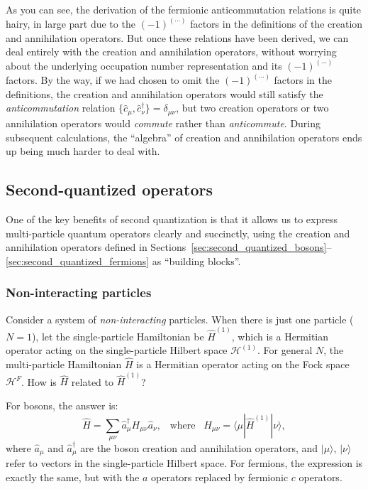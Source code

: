 \documentclass[pra,12pt]{revtex4}
\begin{document}
As you can see, the derivation of the fermionic anticommutation
relations is quite hairy, in large part due to the $(-1)^{(\cdots)}$
factors in the definitions of the creation and annihilation operators.
But once these relations have been derived, we can deal entirely with
the creation and annihilation operators, without worrying about the
underlying occupation number representation and its $(-1)^{(\cdots)}$
factors.  By the way, if we had chosen to omit the $(-1)^{(\cdots)}$
factors in the definitions, the creation and annihilation operators
would still satisfy the \textit{anticommutation} relation
$\{\hat{c}_\mu,\hat{c}_\nu^\dagger\}=\delta_{\mu\nu}$, but two
creation operators or two annihilation operators would
\textit{commute} rather than \textit{anticommute}.  During subsequent
calculations, the ``algebra'' of creation and annihilation operators
ends up being much harder to deal with.

\subsection{Second-quantized operators}
\label{sec:second_quant_op}

One of the key benefits of second quantization is that it allows us to
express multi-particle quantum operators clearly and succinctly, using
the creation and annihilation operators defined in
Sections~\ref{sec:second_quantized_bosons}--\ref{sec:second_quantized_fermions}
as ``building blocks''.

\subsubsection{Non-interacting particles}

Consider a system of \textit{non-interacting} particles.  When there
is just one particle ($N=1$), let the single-particle Hamiltonian be
$\hat{H}^{(1)}$, which is a Hermitian operator acting on the
single-particle Hilbert space $\mathscr{H}^{(1)}$.  For general $N$,
the multi-particle Hamiltonian $\hat{H}$ is a Hermitian operator
acting on the Fock space $\mathscr{H}^F$.  How is $\hat{H}$ related to
$\hat{H}^{(1)}$?

For bosons, the answer is:
\begin{equation}
  \hat{H} = \sum_{\mu\nu} \hat{a}^\dagger_\mu H_{\mu\nu} \hat{a}_\nu,
  \;\;\; \mathrm{where}\;\;\;
  H_{\mu\nu} = \langle\mu|\hat{H}^{(1)}|\nu\rangle,
  \label{twobosonH}
\end{equation}
where $\hat{a}_\mu$ and $\hat{a}_\mu^\dagger$ are the boson creation
and annihilation operators, and $|\mu\rangle$, $|\nu\rangle$ refer to
vectors in the single-particle Hilbert space.  For fermions, the
expression is exactly the same, but with the $a$ operators replaced by
fermionic $c$ operators.
\end{document}

